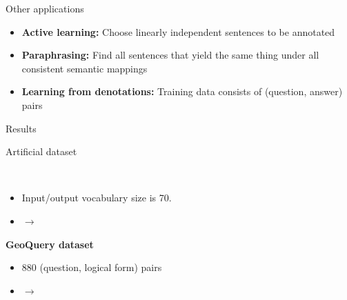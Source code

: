 \documentclass[final,table]{beamer}
\newlength{\onecolwid}
\begin{document}
\begin{frame}[t]
\begin{columns}[t]
\begin{column}{\onecolwid}
\begin{block}{Other applications}
\begin{itemize}
\item {\bf Active learning:}
Choose linearly independent sentences to be annotated

\item {\bf Paraphrasing:}
Find all sentences that yield the same thing under all consistent semantic mappings

\item {\bf Learning from denotations:}
 Training data consists of (question, answer) pairs

\end{itemize}
\end{block}

\begin{block}{Results}
\begin{itemize}
{\bf \item[] Artificial dataset}\\
\begin{itemize}
\item[] Input/output vocabulary size is 70.
\item[] {\scriptsize {} $\rightarrow$
 }\\
\end{itemize}
\vspace{1cm}


\item[] {\bf GeoQuery dataset}\\
\begin{itemize}
\item[] 880 (question, logical form) pairs
\item[] {\scriptsize {} $\rightarrow$
 }\\

\end{itemize}
\vspace{1cm}


\end{itemize}
\end{block}


\end{column} %

\end{columns} %

\end{frame} %
\end{document}

